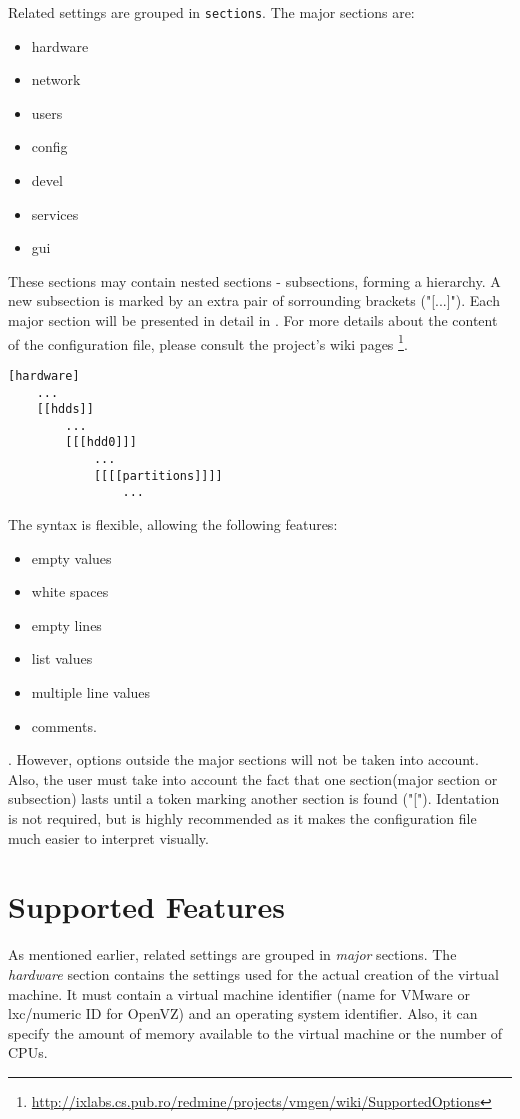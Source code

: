 Related settings are grouped in \texttt{sections}. The major sections are:
\begin{itemize}
  \item hardware
  \item network
  \item users
  \item config
  \item devel
  \item services
  \item gui
\end{itemize}

These sections may contain nested sections - subsections, forming a hierarchy. A new 
subsection is marked by an extra pair of sorrounding brackets ("[...]"). Each major 
section will be presented in detail in . For more 
details about the content of the configuration file, please consult the project's wiki pages
\footnote{\url{http://ixlabs.cs.pub.ro/redmine/projects/vmgen/wiki/SupportedOptions}}.
\\
\lstset{language=Python,caption=Nested sections,
label=lst:subsections}
\begin{lstlisting}
[hardware]
	...
	[[hdds]]
		...
		[[[hdd0]]]
			...
			[[[[partitions]]]]
				...
\end{lstlisting}

The syntax is flexible, allowing the following features:
\begin{itemize}
  \item empty values
  \item white spaces
  \item empty lines
  \item list values
  \item multiple line values
  \item comments. 
\end{itemize}.
However, options outside the major sections will not be taken into account. 
Also, the user must take into account the fact that one section(major section 
or subsection) lasts until a token marking another section is found ("["). 
Identation is not required, but is highly recommended as it makes the 
configuration file much easier to interpret visually.

\section{Supported Features} \label{sec:conf-features}
As mentioned earlier, related settings are grouped in \emph{major} sections. The 
\emph{hardware} section contains the settings used for the actual creation 
of the virtual machine. It must contain a virtual machine identifier (name 
for VMware or lxc/numeric ID for OpenVZ) and an operating system identifier. 
Also, it can specify the amount of memory available to the virtual machine or 
the number of CPUs.

